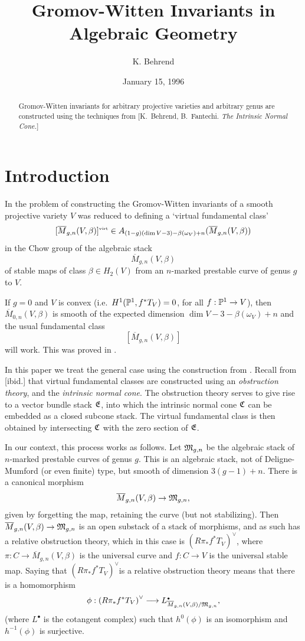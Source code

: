 \documentclass{article}
\title{Gromov-Witten Invariants in Algebraic Geometry}
\author{K. Behrend}
\newcommand{\dual}[1]{{{#1}^{\vee}}}
\newcommand{\virt}{\mbox{\tiny virt}}
\newcommand{\upst}{^{\ast}}
\newcommand{\lst}{_{\ast}}
\newcommand{\com}{^{\scriptscriptstyle\bullet}}
\newcommand{\EE}{{\frak E}}
\newcommand{\MM}{{\frak M}}
\newcommand{\CC}{{\frak C}}
\newcommand{\pp}{{\Bbb P}}
\newcommand{\ol}{\overline}
\begin{document}
\date{January 15, 1996}
\maketitle
\begin{abstract}
{Gromov-Witten invariants for arbitrary projective varieties
and arbitrary genus are constructed using the techniques from
[K.~Behrend, B.~Fantechi. {\em The Intrinsic Normal Cone.\/}]}
\end{abstract}
\tableofcontents






\section{Introduction}

In \cite{BM} the problem of constructing the Gromov-Witten invariants
of a smooth projective variety $V$ was reduced to defining a `virtual
fundamental class'
$$[\ol{M}_{g,n}(V,\beta)]^{\virt}\in A_{(1-g)(\dim
V-3)-\beta(\omega_V)+n}(\ol{M}_{g,n}(V,\beta))$$
in the Chow group of the algebraic stack
$$\ol{M}_{g,n}(V,\beta)$$
of stable maps of class $\beta\in H_2(V)$ from an $n$-marked prestable
curve of genus $g$ to $V$.

If $g=0$ and $V$ is convex (i.e.\ $H^1(\pp^1,f\upst T_V)=0$, for all
$f:\pp^1\to V$), then $\ol{M}_{0,n}(V,\beta)$ is smooth of the
expected dimension $\dim V-3-\beta(\omega_V)+n$ and the usual
fundamental class
$$[\ol{M}_{g,n}(V,\beta)]$$
will work. This was proved in \cite{BM}.

In this paper we treat the general case using the construction from
\cite{BF}. Recall from [ibid.] that virtual fundamental classes are
constructed using an {\em obstruction theory}, and the {\em intrinsic
normal cone}. The obstruction theory serves to give rise to a vector
bundle stack $\EE$, into which the intrinsic normal cone $\CC$ can be
embedded as a closed subcone stack. The virtual fundamental class is
then obtained by intersecting $\CC$ with the zero section of $\EE$.

In our context, this process works as follows. Let $\MM_{g,n}$ be the
algebraic stack of $n$-marked prestable curves of genus $g$. This is
an algebraic stack, not of Deligne-Mumford (or even finite) type, but
smooth of dimension $3(g-1)+n$. There is a canonical morphism
$$\ol{M}_{g,n}(V,\beta) \to \MM_{g,n},$$ given by forgetting the map,
retaining the curve (but not stabilizing). Then $\ol{M}_{g,n}(V,\beta)
\to \MM_{g,n}$ is an open substack of a stack of morphisms, and as
such has a relative obstruction theory, which in this case is
$\dual{(R\pi\lst f\upst T_V)}$, where $\pi:C\to\ol{M}_{g,n}(V,\beta)$
is the universal curve and $f:C\to V$ is the universal stable
map. Saying that $\dual{(R\pi\lst f\upst T_V)}$is a relative
obstruction theory means that there is a homomorphism
$$\phi:\dual{(R\pi\lst f\upst T_V)} \longrightarrow
L\com_{\ol{M}_{g,n}(V,\beta) / \MM_{g,n}},$$ (where $L\com$ is the
cotangent complex) such that $h^0(\phi)$ is an isomorphism and
$h^{-1}(\phi)$ is surjective.
\end{document}
